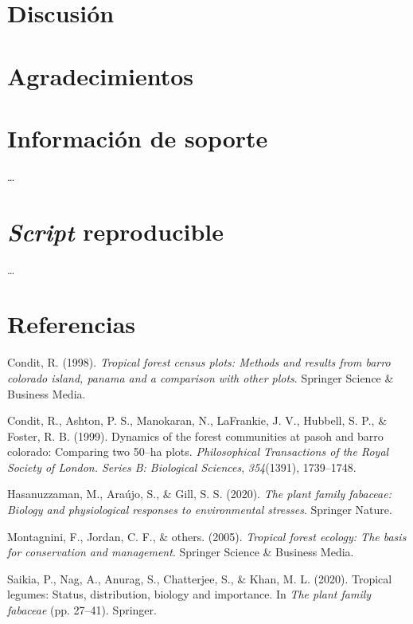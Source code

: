 \documentclass[11pt,]{article}
\begin{document}
\section{Discusión}\label{discusiuxf3n}

\section{Agradecimientos}\label{agradecimientos}

\section{Información de soporte}\label{informaciuxf3n-de-soporte}

\ldots

\section{\texorpdfstring{\emph{Script}
reproducible}{Script reproducible}}\label{script-reproducible}

\ldots

\section*{Referencias}\label{referencias}

\hypertarget{refs}{}
\hypertarget{ref-condit1998tropical}{}
Condit, R. (1998). \emph{Tropical forest census plots: Methods and
results from barro colorado island, panama and a comparison with other
plots}. Springer Science \& Business Media.

\hypertarget{ref-condit1999dynamics}{}
Condit, R., Ashton, P. S., Manokaran, N., LaFrankie, J. V., Hubbell, S.
P., \& Foster, R. B. (1999). Dynamics of the forest communities at pasoh
and barro colorado: Comparing two 50--ha plots. \emph{Philosophical
Transactions of the Royal Society of London. Series B: Biological
Sciences}, \emph{354}(1391), 1739--1748.

\hypertarget{ref-hasanuzzaman2020plant}{}
Hasanuzzaman, M., Araújo, S., \& Gill, S. S. (2020). \emph{The plant
family fabaceae: Biology and physiological responses to environmental
stresses}. Springer Nature.

\hypertarget{ref-montagnini2005tropical}{}
Montagnini, F., Jordan, C. F., \& others. (2005). \emph{Tropical forest
ecology: The basis for conservation and management}. Springer Science \&
Business Media.

\hypertarget{ref-saikia2020tropical}{}
Saikia, P., Nag, A., Anurag, S., Chatterjee, S., \& Khan, M. L. (2020).
Tropical legumes: Status, distribution, biology and importance. In
\emph{The plant family fabaceae} (pp. 27--41). Springer.




\newpage
\singlespacing 
\end{document}
